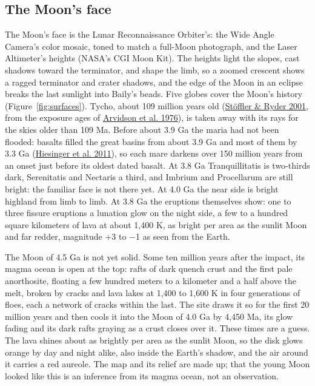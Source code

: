 \documentclass[9pt,twocolumn]{extarticle}
\begin{document}
\subsection{The Moon's face}\label{the-moon-s-face}

The Moon's face is the Lunar Reconnaissance Orbiter's: the Wide Angle Camera's color mosaic, toned to match a full-Moon photograph, and the Laser Altimeter's heights (NASA's CGI Moon Kit). The heights light the slopes, cast shadows toward the terminator, and shape the limb, so a zoomed crescent shows a ragged terminator and crater shadows, and the edge of the Moon in an eclipse breaks the last sunlight into Baily's beads. Five globes cover the Moon's history (Figure~\ref{fig:surfaces}). Tycho, about 109 million years old (\protect\hyperlink{cite.stoffler2001}{Stöffler \& Ryder 2001}, from the exposure ages of \protect\hyperlink{cite.arvidson1976}{Arvidson et al. 1976}), is taken away with its rays for the skies older than 109 Ma. Before about 3.9 Ga the maria had not been flooded: basalts filled the great basins from about 3.9 Ga and most of them by 3.3 Ga (\protect\hyperlink{cite.hiesinger2011}{Hiesinger et al. 2011}), so each mare darkens over 150 million years from an onset just before its oldest dated basalt. At 3.8 Ga Tranquillitatis is two-thirds dark, Serenitatis and Nectaris a third, and Imbrium and Procellarum are still bright: the familiar face is not there yet. At 4.0 Ga the near side is bright highland from limb to limb. At 3.8 Ga the eruptions themselves show: one to three fissure eruptions a lunation glow on the night side, a few to a hundred square kilometers of lava at about 1,400 K, as bright per area as the sunlit Moon and far redder, magnitude +3 to $-$1 as seen from the Earth.

The Moon of 4.5 Ga is not yet solid. Some ten million years after the impact, its magma ocean is open at the top: rafts of dark quench crust and the first pale anorthosite, floating a few hundred meters to a kilometer and a half above the melt, broken by cracks and lava lakes at 1,400 to 1,600 K in four generations of floes, each a network of cracks within the last. The site draws it so for the first 20 million years and then cools it into the Moon of 4.0 Ga by 4,450 Ma, its glow fading and its dark rafts graying as a crust closes over it. These times are a guess. The lava shines about as brightly per area as the sunlit Moon, so the disk glows orange by day and night alike, also inside the Earth's shadow, and the air around it carries a red aureole. The map and its relief are made up; that the young Moon looked like this is an inference from its magma ocean, not an observation.
\end{document}
